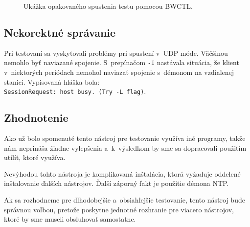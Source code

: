        \begin{figure}[H]
           \begin{center}
               \caption{Ukážka opakovaného spustenia testu pomocou BWCTL.}
               \label{bwctl_c_f_m_I_10_t_2}
           \end{center}
       \end{figure}

        \subsection{Nekorektné správanie} \label{bwctl_chyby}
        Pri testovaní sa vyskytovali problémy pri spustení v~UDP móde. Väčšinou
        nemohlo byť naviazané spojenie. 
        S~prepínačom \texttt{-I} nastávala
        situácia, že klient v~niektorých periódach nemohol naviazať spojenie
        s~démonom na vzdialenej stanici. Vypisovaná hláška bola: \\
        \texttt{SessionRequest: host busy. (Try -L flag)}. 

        \subsection{Zhodnotenie} \label{bwctl_zhod}
        Ako už bolo spomenuté tento nástroj  pre testovanie využíva
        iné programy, takže nám neprináša žiadne
        vylepšenia a~k~výsledkom by sme sa
        dopracovali použitím utilít, ktoré využíva.

        Nevýhodou tohto nástroja je komplikovaná inštalácia, ktorá vyžaduje
        oddelené inštalovanie ďalších nástrojov.
        Ďalší záporný fakt je použitie démona NTP. 

        Ak sa rozhodneme pre dlhodobejšie a~obsiahlejšie testovanie, tento
        nástroj bude správnou voľbou, pretože poskytne jednotné rozhranie pre
        viacero nástrojov, ktoré by sme museli obsluhovať samostatne.


